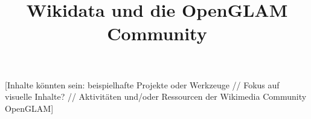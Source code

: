 \documentclass{article}
\begin{document}
\title{Wikidata und die OpenGLAM Community}

\maketitle





[Inhalte könnten sein: beispielhafte Projekte oder Werkzeuge // Fokus auf visuelle Inhalte? // Aktivitäten und/oder Ressourcen der Wikimedia Community OpenGLAM]
\end{document}
